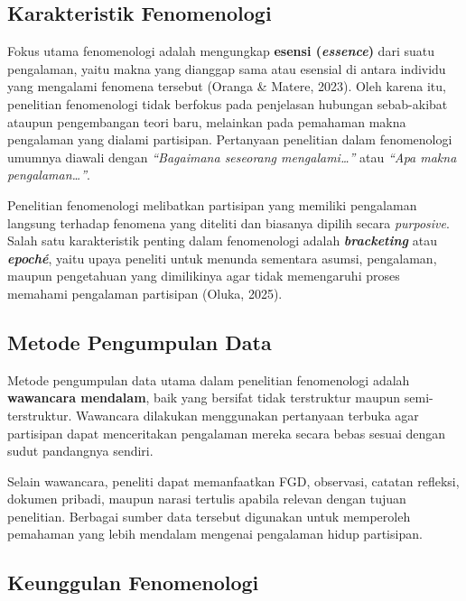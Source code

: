 \documentclass[
  indonesian,
  letterpaper,
  DIV=11,
  numbers=noendperiod]{scrreprt}
\begin{document}
\subsection{Karakteristik
Fenomenologi}\label{karakteristik-fenomenologi}

Fokus utama fenomenologi adalah mengungkap \textbf{esensi
(\emph{essence})} dari suatu pengalaman, yaitu makna yang dianggap sama
atau esensial di antara individu yang mengalami fenomena tersebut
(Oranga \& Matere, 2023). Oleh karena itu, penelitian fenomenologi tidak
berfokus pada penjelasan hubungan sebab-akibat ataupun pengembangan
teori baru, melainkan pada pemahaman makna pengalaman yang dialami
partisipan. Pertanyaan penelitian dalam fenomenologi umumnya diawali
dengan \emph{``Bagaimana seseorang mengalami\ldots{}''} atau \emph{``Apa
makna pengalaman\ldots{}''}.

Penelitian fenomenologi melibatkan partisipan yang memiliki pengalaman
langsung terhadap fenomena yang diteliti dan biasanya dipilih secara
\emph{purposive}. Salah satu karakteristik penting dalam fenomenologi
adalah \textbf{\emph{bracketing}} atau \textbf{\emph{epoché}}, yaitu
upaya peneliti untuk menunda sementara asumsi, pengalaman, maupun
pengetahuan yang dimilikinya agar tidak memengaruhi proses memahami
pengalaman partisipan (Oluka, 2025).

\subsection{Metode Pengumpulan Data}\label{metode-pengumpulan-data-5}

Metode pengumpulan data utama dalam penelitian fenomenologi adalah
\textbf{wawancara mendalam}, baik yang bersifat tidak terstruktur maupun
semi-terstruktur. Wawancara dilakukan menggunakan pertanyaan terbuka
agar partisipan dapat menceritakan pengalaman mereka secara bebas sesuai
dengan sudut pandangnya sendiri.

Selain wawancara, peneliti dapat memanfaatkan FGD, observasi, catatan
refleksi, dokumen pribadi, maupun narasi tertulis apabila relevan dengan
tujuan penelitian. Berbagai sumber data tersebut digunakan untuk
memperoleh pemahaman yang lebih mendalam mengenai pengalaman hidup
partisipan.

\subsection{Keunggulan Fenomenologi}\label{keunggulan-fenomenologi}
\end{document}
